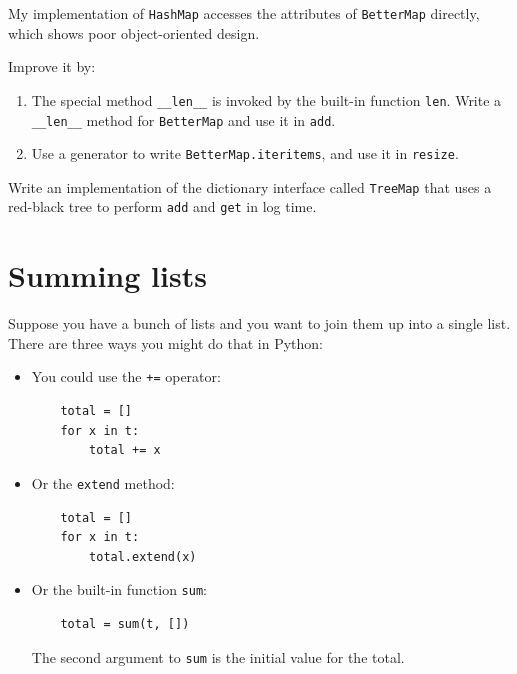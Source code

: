 \documentclass[10pt]{book}
\begin{document}
\begin{ex}

My implementation of {\tt HashMap} accesses the attributes of
{\tt BetterMap} directly, which shows poor object-oriented design.

Improve it by:

\begin{enumerate}

\item The special method \verb"__len__" is invoked by the built-in
function {\tt len}.  Write a \verb"__len__" method for {\tt BetterMap}
and use it in {\tt add}.

\item Use a generator to write {\tt BetterMap.iteritems}, and use it
in {\tt resize}.

\end{enumerate}

\end{ex}


\begin{ex}

Write an implementation of the dictionary interface called
{\tt TreeMap} that uses a red-black tree to perform {\tt add}
and {\tt get} in log time.

\end{ex}



\section{Summing lists}

Suppose you have a bunch of lists and you want to join them up
into a single list.  There are three ways you might do that
in Python:

\begin{itemize}

\item You could use the {\tt +=} operator:

\begin{verbatim}
    total = []
    for x in t:
        total += x
\end{verbatim}

\item Or the {\tt extend} method:

\begin{verbatim}
    total = []
    for x in t:
        total.extend(x)
\end{verbatim}

\item Or the built-in function {\tt sum}:

\begin{verbatim}
    total = sum(t, [])
\end{verbatim}

The second argument to {\tt sum} is the initial value for the total.

\end{itemize}
\end{document}
